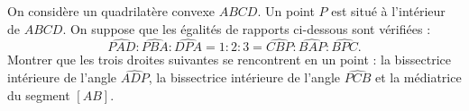 On considère un quadrilatère convexe $ABCD$. Un point $P$ est situé à
l'intérieur de $ABCD$. On suppose que les égalités de rapports ci-dessous
sont vérifiées :
\[
\widehat{PAD} : \widehat{PBA} : \widehat{DPA}
= 1 : 2 : 3 =
\widehat{CBP} : \widehat{BAP} : \widehat{BPC}.
\]
Montrer que les trois droites suivantes se rencontrent en un point : la
bissectrice intérieure de l'angle $\widehat{ADP}$, la bissectrice intérieure
de l'angle $\widehat{PCB}$ et la médiatrice du segment $[AB]$.
